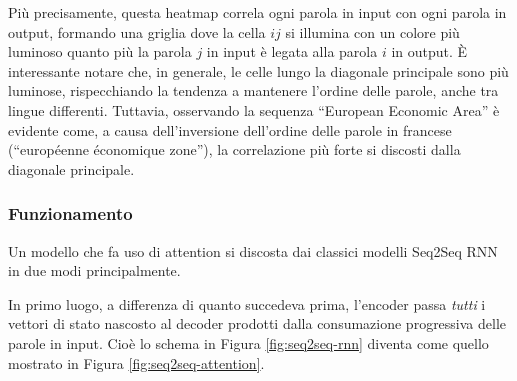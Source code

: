 \documentclass[12pt,a4paper,twoside,openright]{book}
\begin{document}
Più precisamente, questa heatmap correla ogni parola in input con ogni parola in output, formando una griglia dove la cella $ij$ si illumina con un colore più luminoso quanto più la parola $j$ in input è legata alla parola $i$ in output. È interessante notare che, in generale, le celle lungo la diagonale principale sono più luminose, rispecchiando la tendenza a mantenere l'ordine delle parole, anche tra lingue differenti. Tuttavia, osservando la sequenza ``European Economic Area'' è evidente come, a causa dell'inversione dell'ordine delle parole in francese (``européenne économique zone''), la correlazione più forte si discosti dalla diagonale principale.

\subsubsection{Funzionamento}
Un modello che fa uso di attention si discosta dai classici modelli Seq2Seq RNN in due modi principalmente. 

In primo luogo, a differenza di quanto succedeva prima, l'encoder passa \emph{tutti} i vettori di stato nascosto al decoder prodotti dalla consumazione progressiva delle parole in input. Cioè lo schema in Figura \ref{fig:seq2seq-rnn} diventa come quello mostrato in Figura \ref{fig:seq2seq-attention}.
\end{document}
